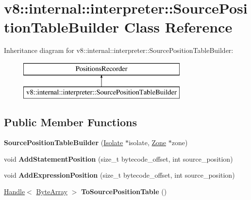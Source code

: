 \hypertarget{classv8_1_1internal_1_1interpreter_1_1_source_position_table_builder}{}\section{v8\+:\+:internal\+:\+:interpreter\+:\+:Source\+Position\+Table\+Builder Class Reference}
\label{classv8_1_1internal_1_1interpreter_1_1_source_position_table_builder}
Inheritance diagram for v8\+:\+:internal\+:\+:interpreter\+:\+:Source\+Position\+Table\+Builder\+:\begin{figure}[H]
\begin{center}
\leavevmode
\includegraphics[height=2.000000cm]{classv8_1_1internal_1_1interpreter_1_1_source_position_table_builder}
\end{center}
\end{figure}
\subsection*{Public Member Functions}
\begin{DoxyCompactItemize}
\item 
{\bfseries Source\+Position\+Table\+Builder} (\hyperlink{classv8_1_1internal_1_1_isolate}{Isolate} $\ast$isolate, \hyperlink{classv8_1_1internal_1_1_zone}{Zone} $\ast$zone)\hypertarget{classv8_1_1internal_1_1interpreter_1_1_source_position_table_builder_a3b2ca705966da48a87dac2dd674cc1df}{}\label{classv8_1_1internal_1_1interpreter_1_1_source_position_table_builder_a3b2ca705966da48a87dac2dd674cc1df}

\item 
void {\bfseries Add\+Statement\+Position} (size\+\_\+t bytecode\+\_\+offset, int source\+\_\+position)\hypertarget{classv8_1_1internal_1_1interpreter_1_1_source_position_table_builder_a81a88c192c2e59d0bf9366fb9010dc12}{}\label{classv8_1_1internal_1_1interpreter_1_1_source_position_table_builder_a81a88c192c2e59d0bf9366fb9010dc12}

\item 
void {\bfseries Add\+Expression\+Position} (size\+\_\+t bytecode\+\_\+offset, int source\+\_\+position)\hypertarget{classv8_1_1internal_1_1interpreter_1_1_source_position_table_builder_a443c586bf410ca44ff6072c88012dec8}{}\label{classv8_1_1internal_1_1interpreter_1_1_source_position_table_builder_a443c586bf410ca44ff6072c88012dec8}

\item 
\hyperlink{classv8_1_1internal_1_1_handle}{Handle}$<$ \hyperlink{classv8_1_1internal_1_1_byte_array}{Byte\+Array} $>$ {\bfseries To\+Source\+Position\+Table} ()\hypertarget{classv8_1_1internal_1_1interpreter_1_1_source_position_table_builder_a94211da2ecc23a00056d70dcd06e3651}{}\label{classv8_1_1internal_1_1interpreter_1_1_source_position_table_builder_a94211da2ecc23a00056d70dcd06e3651}

\end{DoxyCompactItemize}
